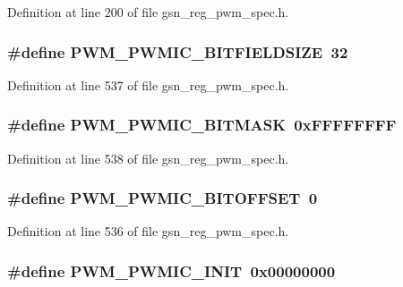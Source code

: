 Definition at line 200 of file gsn\_\-reg\_\-pwm\_\-spec.h.

\hypertarget{a00565_a7d313f8bac74b3afd862d383ce57df50}{
\subsubsection[{PWM\_\-PWMIC\_\-BITFIELDSIZE}]{\setlength{\rightskip}{0pt plus 5cm}\#define PWM\_\-PWMIC\_\-BITFIELDSIZE~32}}
\label{a00565_a7d313f8bac74b3afd862d383ce57df50}


Definition at line 537 of file gsn\_\-reg\_\-pwm\_\-spec.h.

\hypertarget{a00565_ac6be16b81228d8e168d46269385fab6d}{
\subsubsection[{PWM\_\-PWMIC\_\-BITMASK}]{\setlength{\rightskip}{0pt plus 5cm}\#define PWM\_\-PWMIC\_\-BITMASK~0xFFFFFFFF}}
\label{a00565_ac6be16b81228d8e168d46269385fab6d}


Definition at line 538 of file gsn\_\-reg\_\-pwm\_\-spec.h.

\hypertarget{a00565_a8bb11f7bed8dc0591fdf4026a9380dbd}{
\subsubsection[{PWM\_\-PWMIC\_\-BITOFFSET}]{\setlength{\rightskip}{0pt plus 5cm}\#define PWM\_\-PWMIC\_\-BITOFFSET~0}}
\label{a00565_a8bb11f7bed8dc0591fdf4026a9380dbd}


Definition at line 536 of file gsn\_\-reg\_\-pwm\_\-spec.h.

\hypertarget{a00565_a0464f8f18a320328dd7a2e100de3c367}{
\subsubsection[{PWM\_\-PWMIC\_\-INIT}]{\setlength{\rightskip}{0pt plus 5cm}\#define PWM\_\-PWMIC\_\-INIT~0x00000000}}
\label{a00565_a0464f8f18a320328dd7a2e100de3c367}


